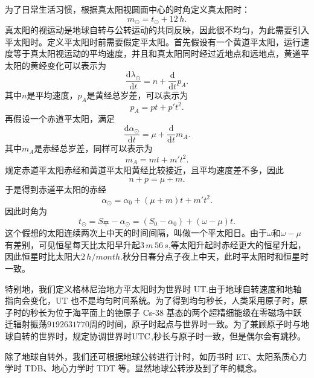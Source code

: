 \documentclass[11pt, a4paper, oneside]{ctexart}
\numberwithin{equation}{subsection}
\begin{document}
为了日常生活习惯，根据真太阳视圆面中心的时角定义真太阳时：
\begin{equation}
m_\odot=t_\odot+12\,\unit{h}.
\end{equation}
真太阳的视运动是地球自转与公转运动的共同反映，因此很不均匀，为此需要引入平太阳时。定义平太阳时前需要假定平太阳。首先假设有一个黄道平太阳，运行速度等于真太阳视运动的平均速度，并且和真太阳同时经过近地点和远地点，黄道平太阳的黄经变化可以表示为
\begin{equation}
\frac{\mathrm{d}\lambda_{\odot}}{\mathrm{d}t}=n+\frac{\mathrm{d}}{\mathrm{d}t}p_{A}.
\end{equation}
其中$n$是平均速度，$p_{A}$是黄经总岁差，可以表示为
\begin{equation}
p_{A}=pt+p't^{2}.
\end{equation}
再假设一个赤道平太阳，满足
\begin{equation}
\frac{\mathrm{d}\alpha_{\odot}}{\mathrm{d}t}=\mu+\frac{\mathrm{d}}{\mathrm{d}t}m_{A}.
\end{equation}
其中$m_{A}$是赤经总岁差，同样可以表示为
\begin{equation}
m_{A}=mt+m't^{2}.
\end{equation}
规定赤道平太阳赤经和黄道平太阳黄经比较接近，且平均速度差不多，因此
\begin{equation}
n+p=\mu+m.
\end{equation}
于是得到赤道平太阳的赤经
\begin{equation}
\alpha_{\odot}=\alpha_{0}+\left(\mu+m\right)t+m't^{2}.
\end{equation}
因此时角为
\begin{equation}
t_{\odot}=S_{\text{平}}-\alpha_{\odot}=\left(S_{0}-\alpha_{0}\right)+\left(\omega-\mu\right)t.
\end{equation}
这个假想的太阳连续两次上中天的时间间隔，叫做一个平太阳日。由于$\omega$和$\omega-\mu$有差别，可见恒星每天比太阳早升起$3\,\unit{m}\,56\,\unit{s}$,等太阳升起时赤经更大的恒星升起，因此恒星时比太阳大$2\,\unit{h/month}$.秋分日春分点子夜上中天，此时平太阳时和恒星时一致。

特别地，我们定义格林尼治地方平太阳时为世界时 UT.由于地球自转速度和地轴指向会变化，UT 也不是均匀时间系统。为了得到均匀秒长，人类采用原子时，原子时的秒长为位于海平面上的铯原子 Cs-38 基态的两个超精细能级在零磁场中跃迁辐射振荡$9192631770$周的时间，原子时起点与世界时一致。为了兼顾原子时与地球自转的世界时，规定协调世界时$\rm UTC$,秒长与原子时一致，但是偶尔会有跳秒。

除了地球自转外，我们还可根据地球公转进行计时，如历书时 ET、太阳系质心力学时 TDB、地心力学时 TDT 等。显然地球公转涉及到了年的概念。
\end{document}
